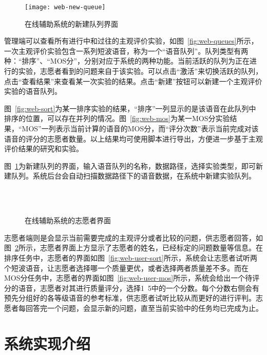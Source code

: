 \begin{figure}
\centering
\texttt{[image: web-new-queue]}
\caption{在线辅助系统的新建队列界面\label{fig:web-new-queue}}
\end{figure}

管理端可以查看所有进行中和过往的主观评价实验，如图~\ref{fig:web-queues}所示，一次主观评价实验包含一系列短波语音，称为一个“语音队列”。队列类型有两种：“排序”、“MOS分”，分别对应于系统的两种功能。当前活跃的队列为正在进行的实验，志愿者看到的问题来自于该实验。可以点击“激活”来切换活跃的队列，点击“查看结果”来查看某一次实验的结果。点击“新建”按钮可以新建一个主观评价实验的语音队列。

图~\ref{fig:web-sort}为某一排序实验的结果，“排序”一列显示的是该语音在此队列中排序的位置，可以存在并列的情况。图~\ref{fig:web-mos}为某一MOS分实验结果，“MOS”一列表示当前计算的语音的MOS分，而“评分次数”表示当前完成对该语音的评分的志愿者数量。以上结果均可使用脚本进行导出，方便进一步基于主观评价结果的研究和实验。

图~\ref{fig:web-new-queue}为新建队列的界面，输入语音队列的名称，数据路径，选择实验类型，即可新建队列。系统后台会自动扫描数据路径下的语音数据，在系统中新建实验队列。

\begin{figure}
\centering
{}
\vspace{1.2ex}
\\
\vspace{0.8ex}
\\
\caption{在线辅助系统的志愿者界面\label{fig:web-user}}
\end{figure}

志愿者端则是会显示当前需要完成的主观评分或者比较的问题，供志愿者回答，如图~\ref{fig:web-user}所示，志愿者界面上方显示了志愿者的姓名，已经标定的问题数量等信息。在排序任务中，志愿者的界面如图~\ref{fig:web-user-sort}所示，系统会让志愿者试听两个短波语音，让志愿者选择哪一个质量更优，或者选择两者质量差不多。而在MOS分任务中，志愿者的界面如图~\ref{fig:web-user-mos}所示，系统会给出一个待评分的语音，志愿者对其进行质量评分，选择1~5中的一个分数。每个分数右侧会有预先分组好的各等级语音的参考标准，供志愿者试听比较从而更好的进行评判。志愿者每回答完一个问题，会显示新的问题，直至当前实验中的任务均已完成为止。

\section{系统实现介绍}

